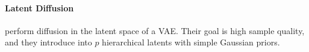 \documentclass[letterpaper]{article} %
\begin{document}




\paragraph{Latent Diffusion}
\citet{vahdat2021score,wehenkel2021diffusion,rombach2022high} perform diffusion in the latent space of a VAE.
Their goal is high sample quality, and they introduce into $p$ hierarchical latents with simple Gaussian priors. 
\end{document}

